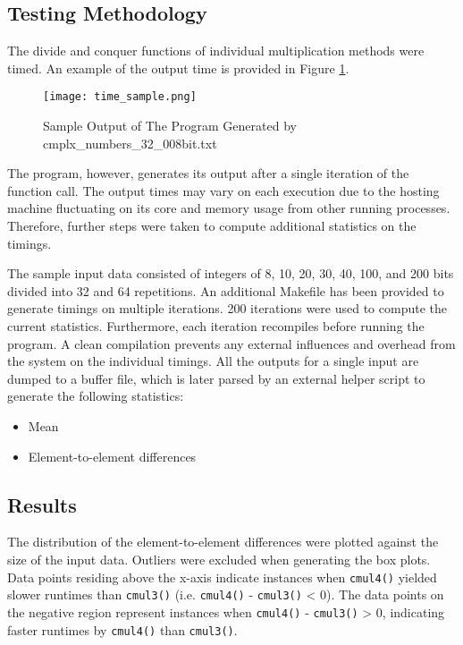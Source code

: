 \documentclass[usletter, 12pt]{article}
\begin{document}
        \subsection{Testing Methodology}
        The divide and conquer functions of individual multiplication methods were timed. An example of the output time is provided in Figure \ref{time_sample}.

        \begin{figure}[ht]
            \begin{center}
                \texttt{[image: time\_sample.png]}
                \caption{Sample Output of The Program Generated by cmplx\_numbers\_32\_008bit.txt} \label{time_sample}
            \end{center}
        \end{figure}

        The program, however, generates its output after a single iteration of the function call. The output times may vary on each execution due to the hosting machine fluctuating on its core and memory usage from other running processes. Therefore, further steps were taken to compute additional statistics on the timings.

        The sample input data consisted of integers of 8, 10, 20, 30, 40, 100, and 200 bits divided into 32 and 64 repetitions. An additional Makefile has been provided to generate timings on multiple iterations. 200 iterations were used to compute the current statistics. Furthermore, each iteration recompiles before running the program. A clean compilation prevents any external influences and overhead from the system on the individual timings. All the outputs for a single input are dumped to a buffer file, which is later parsed by an external helper script to generate the following statistics:

        \begin{itemize}

            \item Mean
            \item Element-to-element differences

        \end{itemize}

        \clearpage
        \newpage
        \subsection{Results}
        The distribution of the element-to-element differences were plotted against the size of the input data. Outliers were excluded when generating the box plots. Data points residing above the x-axis indicate instances when \texttt{cmul4()} yielded slower runtimes than \texttt{cmul3()} (i.e. \texttt{cmul4()} - \texttt{cmul3()} < 0). The data points on the negative region represent instances when \texttt{cmul4()} - \texttt{cmul3()} > 0, indicating faster runtimes by \texttt{cmul4()} than \texttt{cmul3()}.
\end{document}
